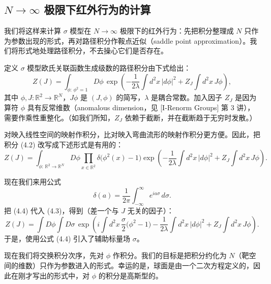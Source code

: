 \subsection{$N\to\infty$ 极限下红外行为的计算}

我们将这样来计算 $\sigma$ 模型在 $N\to\infty$ 极限下的红外行为：先把积分整理成 $N$ 只作为参数出现的形式，再对路径积分作鞍点近似（saddle point approximation）。我们将形式地处理路径积分，不去操心它们是否存在。

定义 $\sigma$ 模型欧氏关联函数生成级数的路径积分由下式给出：
\begin{equation}
  \tag{4.2}
  \label{eq:4-2}
  Z(J)=\int_{\phi:\,\phi^2=1}D\phi\,\exp\left(-\frac{1}{2\lambda}\int d^2x\,|d\phi|^2+Z_J\int d^2x\,J\phi\right),
\end{equation}
其中 $\phi,J:\mathbb{R}^2\to\mathbb{R}^N$，$J\phi$ 是 $(J,\phi)$ 的简写，$\lambda$ 是耦合常数。加入因子 $Z_J$ 是因为算符 $\phi$ 具有反常维数（anomalous dimension，见 [I-Renorm Groups] 第 3 讲），需要作乘性重整化。（如我们所知，$Z_J$ 依赖于截断，并在截断趋于无穷时发散。）

对映入线性空间的映射作积分，比对映入弯曲流形的映射作积分更方便。因此，把积分 (4.2) 改写成下述形式是有用的：
\begin{equation}
  \tag{4.3}
  \label{eq:4-3}
  Z(J)=\int_{\phi:\,\mathbb{R}^2\to\mathbb{R}^N}D\phi\prod_{x\in\mathbb{R}^2}\delta\bigl(\phi^2(x)-1\bigr)\exp\left(-\frac{1}{2\lambda}\int d^2x\,|d\phi|^2+Z_J\int d^2x\,J\phi\right).
\end{equation}

现在我们来用公式
\begin{equation}
  \tag{4.4}
  \label{eq:4-4}
  \delta(a)=\frac{1}{2\pi}\int_{-\infty}^{\infty}e^{ia\sigma}\,d\sigma .
\end{equation}
把 (4.4) 代入 (4.3)，得到（差一个与 $J$ 无关的因子）：
\begin{equation}
  \tag{4.5}
  \label{eq:4-5}
  Z(J)=\int D\phi\int D\sigma\,\exp\left(i\int d^2x\,\frac{\sigma}{2}\bigl(\phi^2-1\bigr)-\frac{1}{2\lambda}\int d^2x\,|d\phi|^2+Z_J\int d^2x\,J\phi\right).
\end{equation}
于是，使用公式 (4.4) 引入了辅助标量场 $\sigma$。

现在我们将交换积分次序，先对 $\phi$ 作积分。我们的目标是把积分约化为 $N$（靶空间的维数）只作为参数进入的形式。幸运的是，球面是由一个二次方程定义的，因此在刚才写出的形式中，对 $\phi$ 的积分是高斯型的。


